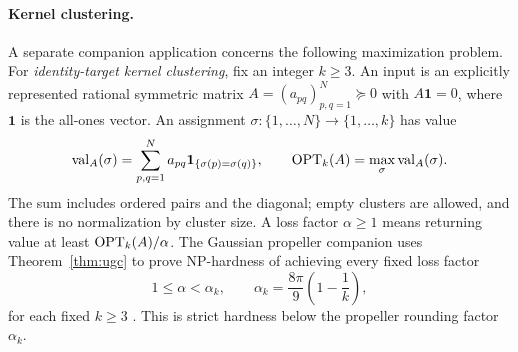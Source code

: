 \paragraph{Kernel clustering.}
A separate companion application concerns the following maximization
problem. For \emph{identity-target kernel clustering}, fix an integer \(k\ge3\).
An input is an explicitly represented rational symmetric matrix
\(A=(a_{pq})_{p,q=1}^N\succeq0\) with \(A\mathbf1=0\), where
\(\mathbf1\) is the all-ones vector.
An assignment \(\sigma:\{1,\ldots,N\}\to\{1,\ldots,k\}\) has value
\[
 \operatorname{val}_A(\sigma)=\sum_{p,q=1}^N
 a_{pq}\mathbf1_{\{\sigma(p)=\sigma(q)\}},
 \qquad
 \operatorname{OPT}_k(A)=\max_\sigma\operatorname{val}_A(\sigma).
\]
The sum includes ordered pairs and the diagonal; empty clusters are
allowed, and there is no normalization by cluster size. A loss factor
\(\alpha\ge1\) means returning value at least \(\operatorname{OPT}_k(A)/\alpha\).
The Gaussian propeller companion uses Theorem~\ref{thm:ugc} to prove
NP-hardness of achieving every fixed loss factor
\[
 1\le\alpha<\alpha_k,
 \qquad \alpha_k=\frac{8\pi}{9}\left(1-\frac1k\right),
\]
for each fixed \(k\ge3\)
\cite[Theorem~6.1]{OpenAIGaussianPropeller2026}.
This is strict hardness below the propeller rounding factor
\(\alpha_k\).
